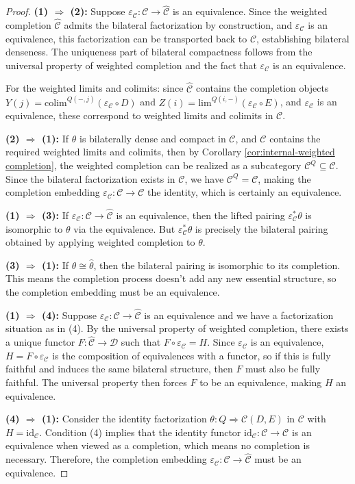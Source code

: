 \documentclass[11pt]{article}
\theoremstyle{plain}
\theoremstyle{definition}
\theoremstyle{remark}
\newcommand{\C}{\mathcal{C}}
\newcommand{\D}{\mathcal{D}}
\newcommand{\id}{\mathrm{id}}
\newcommand{\colim}{\mathrm{colim}}
\renewcommand{\lim}{\mathrm{lim}}
\newcommand{\wh}[1]{\widehat{#1}}
\begin{document}
\begin{proof}
\textbf{(1) $\Rightarrow$ (2):} 
Suppose $\varepsilon_\C : \C \to \wh{\C}$ is an equivalence. Since the weighted completion $\wh{\C}$ admits the bilateral factorization by construction, and $\varepsilon_\C$ is an equivalence, this factorization can be transported back to $\C$, establishing bilateral denseness. The uniqueness part of bilateral compactness follows from the universal property of weighted completion and the fact that $\varepsilon_\C$ is an equivalence.

For the weighted limits and colimits: since $\wh{\C}$ contains the completion objects $Y(j) = \colim^{Q(-, j)} (\varepsilon_\C \circ D)$ and $Z(i) = \lim^{Q(i, -)} (\varepsilon_\C \circ E)$, and $\varepsilon_\C$ is an equivalence, these correspond to weighted limits and colimits in $\C$.

\textbf{(2) $\Rightarrow$ (1):}
If $\theta$ is bilaterally dense and compact in $\C$, and $\C$ contains the required weighted limits and colimits, then by Corollary \ref{cor:internal-weighted completion}, the weighted completion can be realized as a subcategory $\C^Q \subseteq \C$. Since the bilateral factorization exists in $\C$, we have $\C^Q = \C$, making the completion embedding $\varepsilon_\C : \C \to \C$ the identity, which is certainly an equivalence.

\textbf{(1) $\Rightarrow$ (3):}
If $\varepsilon_\C : \C \to \wh{\C}$ is an equivalence, then the lifted pairing $\varepsilon_\C^* \theta$ is isomorphic to $\theta$ via the equivalence. But $\varepsilon_\C^* \theta$ is precisely the bilateral pairing obtained by applying weighted completion to $\theta$.

\textbf{(3) $\Rightarrow$ (1):}
If $\theta \cong \wh{\theta}$, then the bilateral pairing is isomorphic to its completion. This means the completion process doesn't add any new essential structure, so the completion embedding must be an equivalence.

\textbf{(1) $\Rightarrow$ (4):}
Suppose $\varepsilon_\C : \C \to \wh{\C}$ is an equivalence and we have a factorization situation as in (4). By the universal property of weighted completion, there exists a unique functor $F : \wh{\C} \to \D$ such that $F \circ \varepsilon_\C = H$. Since $\varepsilon_\C$ is an equivalence, $H = F \circ \varepsilon_\C$ is the composition of equivalences with a functor, so if this is fully faithful and induces the same bilateral structure, then $F$ must also be fully faithful. The universal property then forces $F$ to be an equivalence, making $H$ an equivalence.

\textbf{(4) $\Rightarrow$ (1):}
Consider the identity factorization $\theta : Q \Rightarrow \C(D, E)$ in $\C$ with $H = \id_\C$. Condition (4) implies that the identity functor $\id_\C : \C \to \C$ is an equivalence when viewed as a completion, which means no completion is necessary. Therefore, the completion embedding $\varepsilon_\C : \C \to \wh{\C}$ must be an equivalence.
\end{proof}
\end{document}
